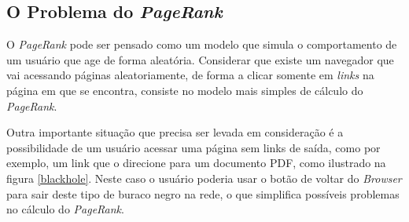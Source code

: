 \documentclass[a4paper]{report} %
\begin{document}
\subsection*{O Problema do \textit{PageRank}}

O \textit{PageRank} pode ser pensado como um modelo que simula o comportamento de um usuário que age de forma aleatória. Considerar que existe um navegador que vai acessando páginas aleatoriamente, de forma a clicar somente em \textit{links} na página em que se encontra, consiste no modelo mais simples de cálculo do \textit{PageRank}. 

Outra importante situação que precisa ser levada em consideração é a possibilidade de um usuário acessar uma página sem links de saída, como por exemplo, um link que o direcione para um documento PDF, como ilustrado na figura \ref{blackhole}. Neste caso o usuário poderia usar o botão de voltar do \textit{Browser} para sair deste tipo de buraco negro na rede, o que simplifica possíveis problemas no cálculo do \textit{PageRank}.  
\end{document}
